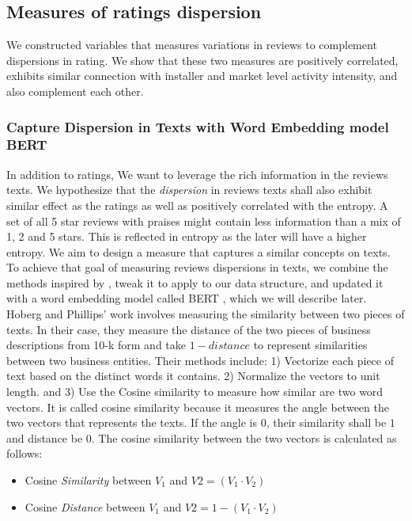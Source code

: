 \documentclass[msom,blindrev]{informs3}
\begin{document}
\subsection{Measures of ratings dispersion}
 We constructed variables that measures variations in reviews to complement dispersions in rating. We show that these two measures are positively correlated, exhibits similar connection with installer and market level activity intensity, and also complement each other. 
\subsubsection{Capture Dispersion in Texts with Word Embedding model BERT}
In addition to ratings, We want to leverage the rich information in the reviews texts. We hypothesize that the \textit{dispersion} in reviews texts shall also exhibit similar effect as the ratings as well as positively correlated with the entropy. A set of all 5 star reviews with praises might contain less information than a mix of 1, 2 and 5 stars. This is reflected in entropy as the later will have a higher entropy. We aim to design a measure that captures a similar concepts on texts. To achieve that goal of measuring reviews dispersions in texts,  we combine the methods inspired by \cite{hoberg2016text}, tweak it to apply to our data structure,  and updated it with a word embedding model called BERT , which we will describe later. \\
Hoberg and Phillips' work involves measuring the similarity between two pieces of texts. In their case, they measure the distance of the two pieces of business descriptions from 10-k form and take $1 - distance$ to represent similarities between two business entities. Their methods include: 1) Vectorize each piece of text based on the distinct words it contains. 2) Normalize the vectors to unit length. and 3) Use the Cosine similarity to measure how similar are two word vectors. It is called cosine similarity because it measures the angle between the two vectors that represents the texts. If the angle is $0$, their similarity shall be $1$ and distance be $0$. The cosine similarity between the two vectors is calculated as follows: \\
\begin{itemize}
\item Cosine \textit{Similarity} between $V_{1}$ and $V{2} =(V_1 \cdot V_2)$
\item Cosine \textit{Distance} between $V_{1}$ and $V{2}=1-(V_1 \cdot V_2)$
\end{itemize}
\end{document}
